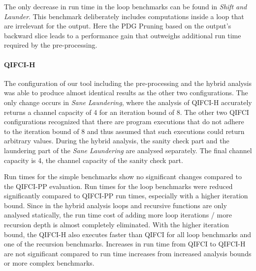 The only decrease in run time in the loop benchmarks can be found in \emph{Shift and Launder}. This benchmark deliberately includes computations inside a loop that are irrelevant for the output. Here the PDG Pruning based on the output's backward slice leads to a performance gain that outweighs additional run time required by the pre-processing.

\paragraph{QIFCI-H}
The configuration of our tool including the pre-processing and the hybrid analysis was able to produce almost identical results as the other two configurations. The only change occurs in \emph{Sane Laundering}, where the analysis of QIFCI-H accurately returns a channel capacity of 4 for an iteration bound of 8. The other two QIFCI configurations recognized that there are program executions that do not adhere to the iteration bound of 8 and thus assumed that such executions could return arbitrary values. During the hybrid analysis, the sanity check part and the laundering part of the \emph{Sane Laundering} are analysed separately. The final channel capacity is 4, the channel capacity of the sanity check part.

Run times for the simple benchmarks show no significant changes compared to the QIFCI-PP evaluation. Run times for the loop benchmarks were reduced significantly compared to QIFCI-PP run times, especially with a higher iteration bound. Since in the hybrid analysis loops and recursive functions are only analysed statically, the run time cost of adding more loop iterations / more recursion depth is almost completely eliminated. With the higher iteration bound, the QIFCI-H also executes faster than QIFCI for all loop benchmarks and one of the recursion benchmarks. Increases in run time from QIFCI to QIFCI-H are not significant compared to run time increases from increased analysis bounds or more complex benchmarks.

